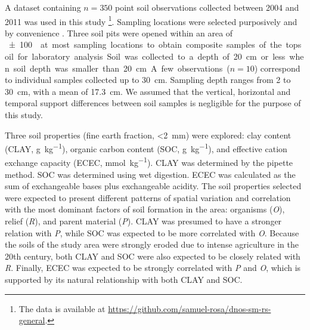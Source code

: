 A dataset containing $n = 350$ point soil observations collected between \num{2004} and \num{2011} 
\cite{PedronEtAl2006b, SamuelRosaEtAl2011a, MiguelEtAl2012, Samuel-RosaEtAl2013} was used in this study
\footnote{The data is available at \url{https://github.com/samuel-rosa/dnos-sm-rs-general}.}. Sampling 
locations were selected purposively and by convenience \cite{Samuel-RosaEtAl2014b}. Three soil pits were opened 
within an area of \SI{\pm100}{\m\square} at most sampling locations to obtain composite samples of the topsoil 
for laboratory analysis. Soil was collected to a depth of \SI{20}{\cm} or less when soil depth was smaller 
than \SI{20}{\cm}. A few observations ($n = 10$) correspond to individual samples collected up to 
\SI{30}{\cm}. Sampling depth ranges from \num{2} to \SI{30}{\cm}, with a mean of \SI{17.3}{\cm}. We assumed 
that the vertical, horizontal and temporal support differences between soil samples is negligible for the 
purpose of this study.

Three soil properties (fine earth fraction, \SI{<2}{\mm}) were explored: clay content (CLAY, 
\si{\gram\per\kilo\gram}), organic carbon content (SOC, \si{\gram\per\kilo\gram}), and effective cation 
exchange capacity (ECEC, \si{\milli\mole\per\kilo\gram}). CLAY was determined by the pipette method. SOC was 
determined using wet digestion. ECEC was calculated as the sum of exchangeable bases plus exchangeable 
acidity. The soil properties selected were expected to present different patterns of spatial variation and 
correlation with the most dominant factors of soil formation \cite{Jenny1941} in the area: organisms 
(\textit{O}), relief (\textit{R}), and parent material (\textit{P}). CLAY was presumed to have a stronger 
relation with \textit{P}, while SOC was expected to be more correlated with \textit{O}. Because the soils of 
the study area were strongly eroded due to intense agriculture in the \num{20}th century, both CLAY and SOC 
were also expected to be closely related with \textit{R}. Finally, ECEC was expected to be strongly correlated 
with \textit{P} and \textit{O}, which is supported by its natural relationship with both CLAY and SOC.

